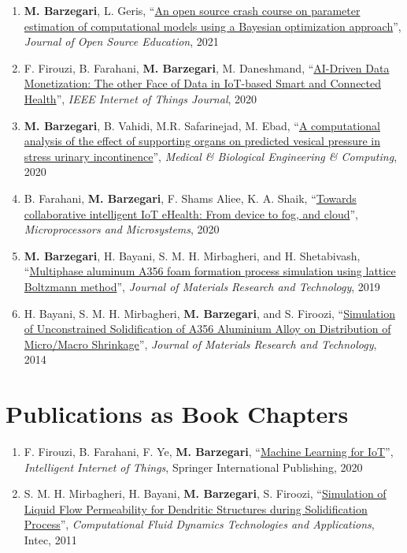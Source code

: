 \begin{enumerate}
\item
\textbf{M. Barzegari}, L. Geris, ``\href{https://doi.org/10.21105/jose.00089}{An open source crash course on parameter estimation of computational models using a Bayesian optimization approach}'', \textit{Journal of Open Source Education}, 2021
\item
F. Firouzi, B. Farahani, \textbf{M. Barzegari}, M. Daneshmand, ``\href{https://doi.org/10.1109/JIOT.2020.3027971}{AI-Driven Data Monetization: The other Face of Data in IoT-based Smart and Connected Health}'', \textit{IEEE Internet of Things Journal}, 2020
\item
\textbf{M. Barzegari}, B. Vahidi, M.R. Safarinejad, M. Ebad, ``\href{https://doi.org/10.1007/s11517-020-02148-2}{A computational analysis of the effect of supporting organs on predicted vesical pressure in stress urinary incontinence}'', \textit{Medical \& Biological Engineering \& Computing}, 2020
\item
B. Farahani, \textbf{M. Barzegari}, F. Shams Aliee, K. A. Shaik, ``\href{https://doi.org/10.1016/j.micpro.2019.102938}{Towards collaborative intelligent IoT eHealth: From device to fog, and cloud}'', \textit{Microprocessors and Microsystems}, 2020
\item
\textbf{M. Barzegari}, H. Bayani, S. M. H. Mirbagheri, and H. Shetabivash, ``\href{https://doi.org/10.1016/j.jmrt.2018.03.010}{Multiphase aluminum A356 foam formation process simulation using lattice Boltzmann method}'', \textit{Journal of Materials Research and Technology}, 2019
\item
H. Bayani, S. M. H. Mirbagheri, \textbf{M. Barzegari}, and S. Firoozi, ``\href{http://www.sciencedirect.com/science/article/pii/S2238785413001129}{Simulation of Unconstrained Solidification of A356 Aluminium Alloy on Distribution of Micro/Macro Shrinkage}'', \textit{Journal of Materials Research and Technology}, 2014
\end{enumerate}

\section*{Publications as Book Chapters}

\begin{enumerate}
\item
F. Firouzi, B. Farahani, F. Ye, \textbf{M. Barzegari}, ``\href{https://link.springer.com/chapter/10.1007\%2F978-3-030-30367-9_5}{Machine Learning for IoT}'', \textit{Intelligent Internet of Things}, Springer International Publishing, 2020
\item
S. M. H. Mirbagheri, H. Bayani, \textbf{M. Barzegari}, S. Firoozi, ``\href{https://www.intechopen.com/books/computational-fluid-dynamics-technologies-and-applications/simulation-of-liquid-flow-permeability-for-dendritic-structures-during-solidification-process}{Simulation of Liquid Flow Permeability for Dendritic Structures during Solidification Process}'', \textit{Computational Fluid Dynamics Technologies and Applications}, Intec, 2011
\end{enumerate}

